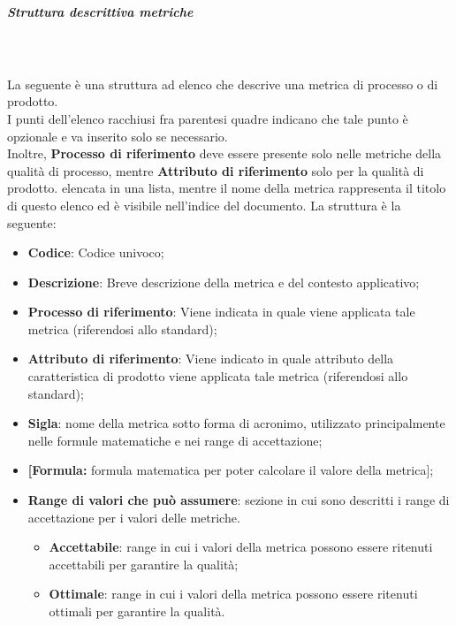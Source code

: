 \subparagraph{Struttura descrittiva metriche}\mbox{}\\ \\
La seguente è una struttura ad elenco che descrive una metrica di processo o di prodotto. \\
I punti dell'elenco racchiusi fra parentesi quadre indicano che tale punto è opzionale e va inserito solo se necessario.\\
Inoltre, \textbf{Processo di riferimento} deve essere presente solo nelle metriche della qualità di processo, mentre \textbf{Attributo di riferimento} solo per la qualità di prodotto.
elencata in una lista, mentre il nome della metrica rappresenta il titolo di questo elenco ed è visibile nell'indice del documento. La struttura è la seguente:
\begin{itemize}
    \item \textbf{Codice}: Codice univoco;
    \item \textbf{Descrizione}: Breve descrizione della metrica e del contesto applicativo;
    \item \textbf{Processo di riferimento}: Viene indicata in quale  viene applicata tale metrica (riferendosi allo standard);
    \item \textbf{Attributo di riferimento}: Viene indicato in quale attributo della caratteristica di prodotto viene applicata tale metrica (riferendosi allo standard);
    \item \textbf{Sigla}: nome della metrica sotto forma di acronimo, utilizzato principalmente nelle formule matematiche e nei range di accettazione;
    \item \textbf{[Formula:} formula matematica per poter calcolare il valore della metrica];
    \item \textbf{Range di valori che può assumere}: sezione in cui sono descritti i range di accettazione per i valori delle metriche.
    \begin{itemize}
        \item \textbf{Accettabile}: range in cui i valori della metrica possono essere ritenuti accettabili per garantire la qualità;
        \item \textbf{Ottimale}: range in cui i valori della metrica possono essere ritenuti ottimali per garantire la qualità.
    \end{itemize}
\end{itemize} 

